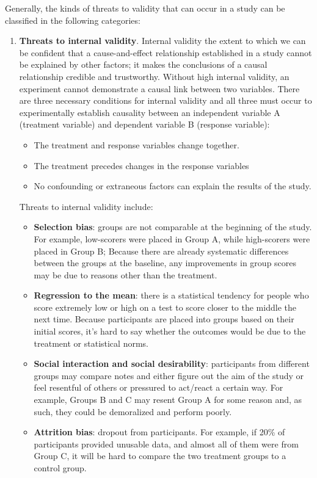 Generally, the kinds of threats to validity that can occur in a study can be classified in the following categories:
\begin{enumerate}
    \item \textbf{Threats to internal validity}. Internal validity the extent to which we can be confident that a cause-and-effect relationship established in a study cannot be explained by other factors; it makes the conclusions of a causal relationship credible and trustworthy. Without high internal validity, an experiment cannot demonstrate a causal link between two variables.
    There are three necessary conditions for internal validity and all three must occur to experimentally establish causality between an independent variable A (treatment variable) and dependent variable B (response variable):
    \begin{itemize}
        \item The treatment and response variables change together.
        \item The treatment precedes changes in the response variables
        \item No confounding or extraneous factors can explain the results of the study.
    \end{itemize}
    Threats to internal validity include: 
    \begin{itemize}
        \item \textbf{Selection bias}: groups are not comparable at the beginning of the study. For example, low-scorers were placed in Group A, while high-scorers were placed in Group B; Because there are already systematic differences between the groups at the baseline, any improvements in group scores may be due to reasons other than the treatment.
        \item \textbf{Regression to the mean}: there is a statistical tendency for people who score extremely low or high on a test to score closer to the middle the next time. Because participants are placed into groups based on their initial scores, it's hard to say whether the outcomes would be due to the treatment or statistical norms.
        \item \textbf{Social interaction and social desirability}: participants from different groups may compare notes and either figure out the aim of the study or feel resentful of others or pressured to act/react a certain way. For example, Groups B and C may resent Group A for some reason and, as such, they could be demoralized and perform poorly.
        \item \textbf{Attrition bias}: dropout from participants. For example, if 20\% of participants provided unusable data, and almost all of them were from Group C, it will be hard to compare the two treatment groups to a control group.
    \end{itemize}
    

\end{enumerate}
